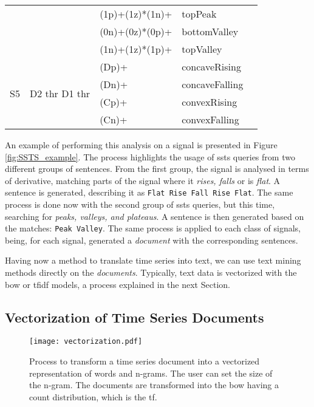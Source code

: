 \begin{table}
\begin{center}
\begin{tabularx}{\linewidth}{ XXXXX }
 & & (1p)+(1z)*(1n)+ & \textcolor{myblue2}{topPeak}\\
 & & (0n)+(0z)*(0p)+ & \textcolor{mypurple}{bottomValley}\\
 & & (1n)+(1z)*(1p)+ & \textcolor{myorange}{topValley}\\
 \hline
\multirow{4}{1em}{S5} & \multirow{4}{6em}{D2 thr D1 thr} & (Dp)+ & concaveRising\\
& & (Dn)+ & concaveFalling\\
& & (Cp)+ & convexRising\\
& &(Cn)+ & convexFalling\\
\bottomrule[1.5pt]
\end{tabularx}
\label{tab:ssts_queries}
\end{center}
\end{table}
 
An example of performing this analysis on a signal is presented in Figure \ref{fig:SSTS_example}. The process highlights the usage of \gls{ssts} queries from two different groups of sentences. From the first group, the signal is analysed in terms of derivative, matching parts of the signal where it \textit{rises, falls} or is \textit{flat}. A sentence is generated, describing it as \texttt{Flat Rise Fall Rise Flat}. The same process is done now with the second group of \gls{ssts} queries, but this time, searching for \textit{peaks, valleys, and plateaus}. A sentence is then generated based on the matches: \texttt{Peak Valley}. The same process is applied to each class of signals, being, for each signal, generated a \textit{document} with the corresponding sentences.

Having now a method to translate time series into text, we can use text mining methods directly on the \textit{documents}. Typically, text data is vectorized with the \gls{bow} or \gls{tfidf} models, a process explained in the next Section.

\subsection{Vectorization of Time Series Documents}

\begin{figure}[!h]
    \centering
    \texttt{[image: vectorization.pdf]}
    \caption{Process to transform a time series document into a vectorized representation of words and n-grams. The user can set the size of the n-gram. The documents are transformed into the \gls{bow} having a count distribution, which is the \gls{tf}.}
    \label{fig:sentence_gen}
\end{figure}


